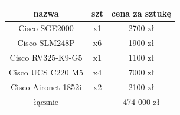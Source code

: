 \documentclass{article}
\begin{document}
\begin{tabular}[!ht]{c|c|c}
nazwa & szt &cena za sztukę\\
\hline
Cisco SGE2000       &  x1 & 2700 zł\\
Cisco SLM248P       &   x6  & 1900 zł\\
Cisco RV325-K9-G5   &   x1  & 1100 zł\\
Cisco UCS C220 M5   &   x4  & 7000 zł\\
Cisco Aironet 1852i &   x2  & 2100 zł\\
\hline
\hline
łącznie&& 474 000 zł
\end{tabular}
\end{document}
